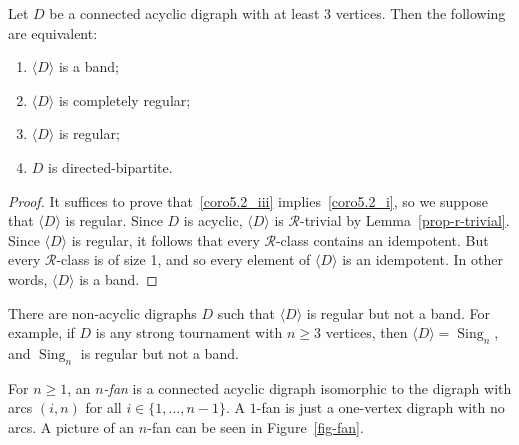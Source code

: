 \documentclass[ALCO,ThmDefs,Unicode,epreuves]{cedram}
\DeclareMathOperator{\Sing}{Sing}
\newcommand{\genset}[1]{\langle#1\rangle}
\newcommand{\R}{\mathcal{R}}
\begin{document}
\begin{corollary}\label{prop-bands}
 Let $D$ be a connected acyclic digraph with at least $3$ vertices. 
 Then the following are equivalent:
 \begin{enumerate}[(\roman*)]

 \item\label{coro5.2_i}
 $\genset{D}$ is a band;

 \item\label{coro5.2_ii}
 $\genset{D}$ is completely regular;

 \item\label{coro5.2_iii}
 $\genset{D}$ is regular;

 \item\label{coro5.2_iv} 
 $D$ is directed-bipartite.
 \end{enumerate}
\end{corollary}
\begin{proof}
 It suffices to prove that~\ref{coro5.2_iii} implies~\ref{coro5.2_i}, so we suppose that $\genset{D}$
 is regular.
 Since $D$ is acyclic, $\genset{D}$ is $\R$-trivial by
 Lemma~\ref{prop-r-trivial}. Since $\genset{D}$ is regular, it follows that
 every $\R$-class contains an idempotent. But every $\R$-class is of size 1,
 and so every element of $\genset{D}$ is an idempotent. In other words,
 $\genset{D}$ is a band.
\end{proof}
 

There are non-acyclic digraphs $D$ such that $\genset{D}$ is regular but not a
band. For example, if $D$ is any strong tournament with $n\geq3$ vertices, then
$\genset{D} = \Sing_n$, and $\Sing_n$ is regular but not a band. 

For $n\geq1$, an \emph{$n$-fan} is a connected acyclic digraph
isomorphic to the digraph with arcs $(i, n)$ for all $i\in\{1, \ldots,
n-1\}$. A $1$-fan is just a one-vertex digraph with no arcs. A picture of an
$n$-fan can be seen in Figure~\ref{fig-fan}.
\end{document}
